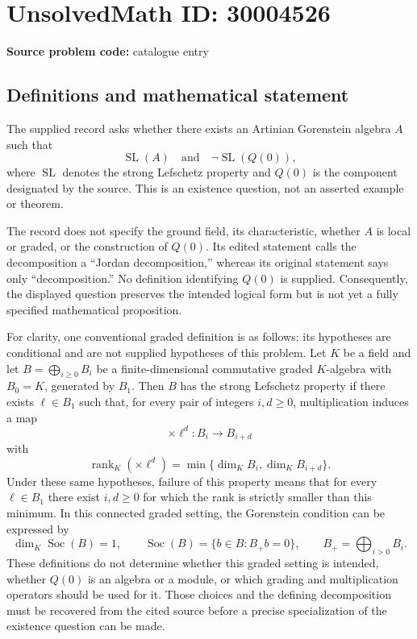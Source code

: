 \documentclass[11pt]{article}
\begin{document}
\section*{UnsolvedMath ID: 30004526}
\textbf{Source problem code:} catalogue entry
\subsection{Definitions and mathematical statement}
The supplied record asks whether there exists an Artinian Gorenstein algebra \(A\) such that
\[
\operatorname{SL}(A)\quad\text{and}\quad\neg\operatorname{SL}(Q(0)),
\]
where \(\operatorname{SL}\) denotes the strong Lefschetz property and \(Q(0)\) is the component designated by the source. This is an existence question, not an asserted example or theorem.

The record does not specify the ground field, its characteristic, whether \(A\) is local or graded, or the construction of \(Q(0)\). Its edited statement calls the decomposition a ``Jordan decomposition,'' whereas its original statement says only ``decomposition.'' No definition identifying \(Q(0)\) is supplied. Consequently, the displayed question preserves the intended logical form but is not yet a fully specified mathematical proposition.

For clarity, one conventional graded definition is as follows; its hypotheses are conditional and are not supplied hypotheses of this problem. Let \(K\) be a field and let \(B=\bigoplus_{i\geq 0}B_i\) be a finite-dimensional commutative graded \(K\)-algebra with \(B_0=K\), generated by \(B_1\). Then \(B\) has the strong Lefschetz property if there exists \(\ell\in B_1\) such that, for every pair of integers \(i,d\geq 0\), multiplication induces a map
\[
\times\ell^d:B_i\longrightarrow B_{i+d}
\]
with
\[
\operatorname{rank}_K(\times\ell^d)=\min\{\dim_K B_i,\dim_K B_{i+d}\}.
\]
Under these same hypotheses, failure of this property means that for every \(\ell\in B_1\) there exist \(i,d\geq 0\) for which the rank is strictly smaller than this minimum. In this connected graded setting, the Gorenstein condition can be expressed by
\[
\dim_K\operatorname{Soc}(B)=1,\qquad
\operatorname{Soc}(B)=\{b\in B:B_+b=0\},\qquad
B_+=\bigoplus_{i>0}B_i.
\]
These definitions do not determine whether this graded setting is intended, whether \(Q(0)\) is an algebra or a module, or which grading and multiplication operators should be used for it. Those choices and the defining decomposition must be recovered from the cited source before a precise specialization of the existence question can be made.
\end{document}
